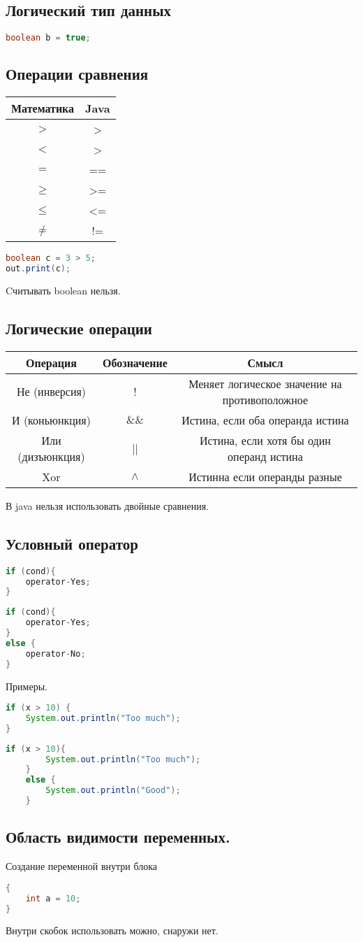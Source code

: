 \documentclass{article}
\begin{document}
\subsection{Логический тип данных}
\begin{lstlisting}[language=Java] 
boolean b = true; 
\end{lstlisting} 
\subsection{Операции сравнения}
\begin{tabular}
    {c | c}
    Математика & Java \\
    \hline
    $>$ & >\\
    $<$ & >\\
    $=$ & == \\
    $\ge $ & >=\\
    $\le $ & <=\\
    $\neq$ & !=\\
\end{tabular}
\begin{lstlisting}[language=Java] 
boolean c = 3 > 5;
out.print(c);
\end{lstlisting} 
Cчитывать boolean нельзя.
\subsection{Логические операции}
\begin{tabular}
    {|c | c | c |}
    \hline
    Операция & Обозначение & Смысл  \\
    \hline
    Не (инверсия) & ! & Меняет логическое значение на противоположное \\
    \hline
    И (коньюнкция) & $\&\&$ & Истина, если оба операнда истина \\
    \hline
    Или (дизъюнкция) & || & Истина, если хотя бы один операнд истина \\
    \hline
    Xor & $\land$ & Истинна если операнды разные \\
    \hline
\end{tabular}
В java нельзя использовать двойные сравнения.
\subsection{Условный оператор}
\begin{lstlisting}[language=Java] 
if (cond){
    operator-Yes;
} 
\end{lstlisting} 
\begin{lstlisting}[language=Java] 
if (cond){
    operator-Yes;
}
else {
    operator-No;
}
\end{lstlisting} 
Примеры.
\begin{lstlisting}[language=Java] 
if (x > 10) {
    System.out.println("Too much");
} 
\end{lstlisting} 
\begin{lstlisting}[language=Java] 
    if (x > 10){
        System.out.println("Too much");
    } 
    else {
        System.out.println("Good");
    }
\end{lstlisting} 
\subsection{Область видимости переменных.}
Создание переменной внутри блока 
\begin{lstlisting}[language=Java] 
{
    int a = 10;
} 
\end{lstlisting} 
Внутри скобок использовать можно, снаружи нет.
\end{document}
